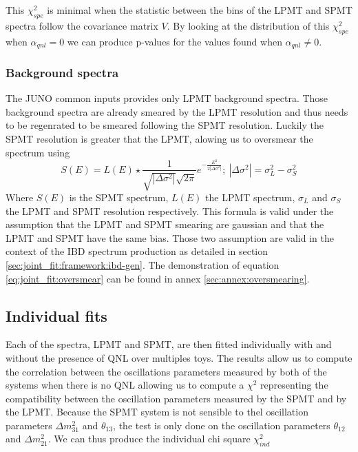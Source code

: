 \documentclass[../main.tex]{subfiles}
\begin{document}
This $\chi^2_{spe}$ is minimal when the statistic between the bins of the LPMT and SPMT spectra follow the covariance matrix $V$. By looking at the distribution of this $\chi^2_{spe}$ when $\alpha_{qnl} = 0$ we can produce p-values for the values found when $\alpha_{qnl} \neq 0$.

\subsubsection{Background spectra}

The JUNO common inputs provides only LPMT background spectra. Those background spectra are already smeared by the LPMT resolution and thus needs to be regenrated to be smeared following the SPMT resolution. Luckily the SPMT resolution is greater that the LPMT, alowing us to oversmear the spectrum using
\begin{equation}
  \label{eq:joint_fit:oversmear}
  S(E) = L(E) \star \frac{1}{\sqrt{|\Delta \sigma^2|} \sqrt{2\pi}} e^{-\frac{E^2}{2|\Delta \sigma^2|}}; ~ |\Delta \sigma^2| = \sigma_L^2 - \sigma_S^2
\end{equation}
Where $S(E)$ is the SPMT spectrum, $L(E)$ the LPMT spectrum, $\sigma_L$ and $\sigma_S$ the LPMT and SPMT resolution respectively. This formula is valid under the assumption that the LPMT and SPMT smearing are gaussian and that the LPMT and SPMT have the same bias. Those two assumption are valid in the context of the IBD spectrum production as detailed in section \ref{sec:joint_fit:framework:ibd-gen}.
The demonstration of equation \ref{eq:joint_fit:oversmear} can be found in annex \ref{sec:annex:oversmearing}.



\subsection{Individual fits}

Each of the spectra, LPMT and SPMT, are then fitted individually with and without the presence of QNL over multiples toys. The results allow us to compute the correlation between the oscillations parameters measured by both of the systems when there is no QNL allowing us to compute a $\chi^2$ representing the compatibility between the oscillation parameters measured by the SPMT and by the LPMT. Because the SPMT system is not sensible to thel oscillation parameters $\Delta m^2_{31}$ and $\theta_{13}$, the test is only done on the oscillation parameters $\theta_{12}$ and $\Delta m^2_{21}$. We can thus produce the individual chi square $\chi^2_{ind}$
\end{document}
